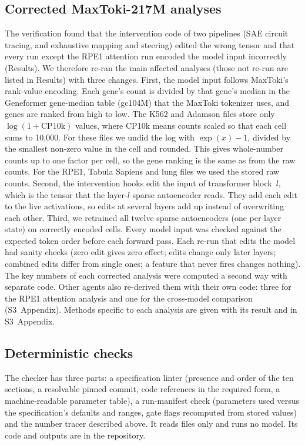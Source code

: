 \subsection*{Corrected MaxToki-217M analyses}
The verification found that the intervention code of two pipelines (SAE
circuit tracing, and exhaustive mapping and steering) edited the wrong
tensor and that every run except the RPE1 attention run encoded the model
input incorrectly (Results). We therefore re-ran the main affected
analyses (those not re-run are listed in Results) with three changes.
First, the model input follows MaxToki's rank-value encoding. Each gene's count is divided by that gene's median in the
Geneformer gene-median table (gc104M) that the MaxToki tokenizer uses,
and genes are ranked from high to low. The K562 and Adamson files store
only $\log(1+\text{CP10k})$ values, where CP10k means counts scaled so
that each cell sums to 10,000. For these files we undid the log with
$\exp(x)-1$, divided by the smallest non-zero value in the cell and
rounded. This gives whole-number counts up to one factor per cell, so the
gene ranking is the same as from the raw counts. For the RPE1, Tabula
Sapiens and lung files we used the stored raw counts. Second, the
intervention hooks edit the input of transformer block~$l$, which is the
tensor that the layer-$l$ sparse autoencoder reads. They add each edit to
the live activations, so edits at several layers add up instead of
overwriting each other. Third, we retrained all twelve sparse
autoencoders (one per layer state) on correctly encoded cells. Every
model input was checked against the expected token order before each
forward pass. Each re-run that edits the model had sanity checks (zero
edit gives zero effect; edits change only later layers; combined edits
differ from single ones; a feature that never fires changes nothing). The
key numbers of each corrected analysis were computed a second way with
separate code. Other agents also re-derived them with their own code:
three for the RPE1 attention analysis and one for the cross-model
comparison (S3~Appendix). Methods
specific to each analysis are given with its result and in S3~Appendix.

\subsection*{Deterministic checks}
The checker has three parts: a specification linter (presence and order
of the ten sections, a resolvable pinned commit, code references in the
required form, a machine-readable parameter table), a run-manifest check
(parameters used versus the specification's defaults and ranges, gate
flags recomputed from stored values) and the number tracer described
above. It reads files only and runs no model. Its code and outputs are in
the repository.

